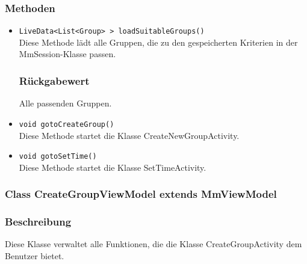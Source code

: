 \documentclass[a4paper]{scrreprt}
\begin{document}
\subsubsection*{Methoden}
\begin{addmargin}[25pt]{0pt}
\begin{itemize}

\item \texttt{LiveData<List<Group> > loadSuitableGroups()}\\
	Diese Methode lädt alle Gruppen, die zu den gespeicherten Kriterien in der MmSession-Klasse passen.

	\subsubsection*{Rückgabewert}
	Alle passenden Gruppen.

\item \texttt{void gotoCreateGroup()}\\
Diese Methode startet die Klasse CreateNewGroupActivity.

\item \texttt{void gotoSetTime()}\\	
Diese Methode startet die Klasse SetTimeActivity.

\end{itemize}
\end{addmargin}


\subsubsection{Class CreateGroupViewModel extends MmViewModel}
\subsubsection*{Beschreibung}
Diese Klasse verwaltet alle Funktionen, die die Klasse CreateGroupActivity dem Benutzer bietet.
\end{document}

